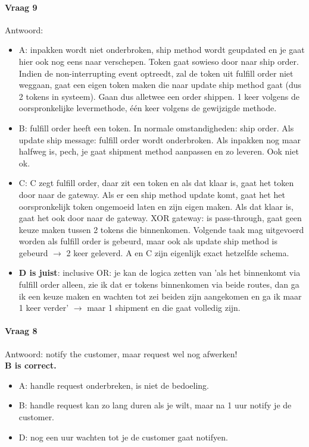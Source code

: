 \documentclass[10pt,a4paper]{report}
\begin{document}
\paragraph{Vraag 9}Antwoord: 
\begin{itemize}
\item A: inpakken wordt niet onderbroken, ship method wordt geupdated en je gaat hier ook nog eens naar verschepen. Token gaat sowieso door naar ship order. Indien de non-interrupting event optreedt, zal de token uit fulfill order niet weggaan, gaat een eigen token maken die naar update ship method gaat (dus 2 tokens in systeem). Gaan dus alletwee een order shippen. 1 keer volgens de oorspronkelijke levermethode, \'e\'en keer volgens de gewijzigde methode.
\item B: fulfill order heeft een token. In normale omstandigheden: ship order. Als  update ship message: fulfill order wordt onderbroken. Als inpakken nog maar halfweg is, pech, je gaat shipment method aanpassen en zo leveren. Ook niet ok.
\item C: C zegt fulfill order, daar zit een token en als dat klaar is, gaat het token door naar de gateway. Als er een ship method update komt, gaat het het oorspronkelijk token ongemoeid laten en zijn eigen maken. Als dat klaar is, gaat het ook door naar de gateway. XOR gateway: is pass-through, gaat geen keuze maken tussen 2 tokens die binnenkomen. Volgende taak mag uitgevoerd worden als fulfill order is gebeurd, maar ook als update ship method is gebeurd $\rightarrow$ 2 keer geleverd. A en C zijn eigenlijk exact hetzelfde schema.
\item \textbf{D is juist}: inclusive OR: je kan de logica zetten van 'als het binnenkomt via fulfill order alleen, zie ik dat er tokens binnenkomen via beide routes, dan ga ik een keuze maken en wachten tot zei beiden zijn aangekomen en ga ik maar 1 keer verder' $\rightarrow$ maar 1 shipment en die gaat volledig zijn.
\end{itemize}

\paragraph{Vraag 8}Antwoord: notify the customer, maar request wel nog afwerken!\\
\textbf{B is correct.}
\begin{itemize}
\item A: handle request onderbreken, is niet de bedoeling. 
\item B: handle request kan zo lang duren als je wilt, maar na 1 uur notify je de customer.
\item D: nog een uur wachten tot je de customer gaat notifyen.
\end{itemize}
\end{document}

